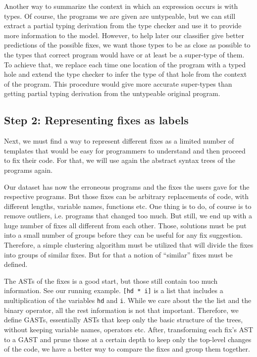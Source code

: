  Another way to summarize the context in which an expression occurs is with types. Of course, the programs we are given are untypeable, but we can still extract a partial typing derivation from the type checker and use it to provide more information to the model. However, to help later our classifier give better predictions of the possible fixes, we want those types to be as close as possible to the types that correct program would have or at least be a super-type of them. To achieve that, we replace each time one location of the program with a typed hole and extend the type checker to infer the type of that hole from the context of the program. This procedure would give more accurate super-types than getting partial typing derivation from the untypeable original program.



\subsection{Step 2: Representing fixes as labels}

Next, we must find a way to represent different fixes as a limited number of templates that would be easy for programmers to understand and then proceed to fix their code. For that, we will use again the abstract syntax trees of the programs again.

 Our dataset has now the erroneous programs and the fixes the users gave for the respective programs. But those fixes can be arbitrary replacements of code, with different lengths, variable names, functions etc. One thing is to do, of course is to remove outliers, i.e. programs that changed too much. But still, we end up with a huge number of fixes all different from each other. Those, solutions must be put into a small number of groups before they can be useful for any fix suggestion. Therefore, a simple clustering algorithm must be utilized that will divide the fixes into groups of similar fixes. But for that a notion of “similar” fixes must be defined.

 The ASTs of the fixes is a good start, but those still contain too much information. See our running example. \texttt{[hd * i]} is a list that includes a multiplication of the variables \texttt{hd} and \texttt{i}. While we care about the the list and the binary operator, all the rest information is not that important. Therefore, we define GASTs, essentially ASTs that keep only the basic structure of the trees, without keeping variable names, operators etc. After, transforming each fix’s AST to a GAST and prune those at a certain depth to keep only the top-level changes of the code, we have a better way to compare the fixes and group them together.

